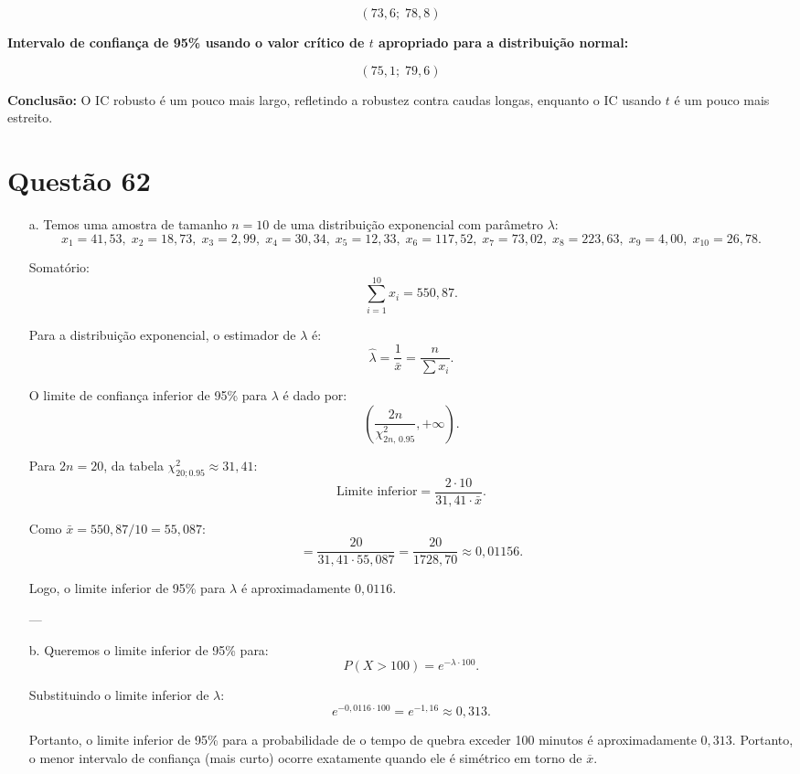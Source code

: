 \documentclass[12pt]{article}
\newcommand{\quest}[1]{\section*{Questão #1}} %
\begin{document}
\[
(73,6;\; 78,8)
\]

\textbf{Intervalo de confiança de 95\% usando o valor crítico de \(t\) apropriado para a distribuição normal:}

\[
(75,1;\; 79,6)
\]

\textbf{Conclusão:} O IC robusto é um pouco mais largo, refletindo a robustez contra caudas longas, enquanto o IC usando \(t\) é um pouco mais estreito.


\quest{62}

\begin{enumerate}
    \item[a.] Temos uma amostra de tamanho \(n=10\) de uma distribuição exponencial com parâmetro \(\lambda\):
    \[
    x_1=41,53,\; x_2=18,73,\; x_3=2,99,\; x_4=30,34,\; x_5=12,33,\; 
    x_6=117,52,\; x_7=73,02,\; x_8=223,63,\; x_9=4,00,\; x_{10}=26,78.
    \]
    
    Somatório:
    \[
    \sum_{i=1}^{10} x_i = 550,87.
    \]
    
    Para a distribuição exponencial, o estimador de \(\lambda\) é:
    \[
    \hat{\lambda} = \frac{1}{\bar{x}} = \frac{n}{\sum x_i}.
    \]
    
    O limite de confiança inferior de 95\% para \(\lambda\) é dado por:
    \[
    \left( \frac{2n}{\chi^2_{2n,\,0.95}} , +\infty \right).
    \]
    
    Para \(2n=20\), da tabela \(\chi^2_{20;0.95} \approx 31,41\):
    \[
    \text{Limite inferior} = \frac{2 \cdot 10}{31,41 \cdot \bar{x}}.
    \]
    
    Como \(\bar{x} = 550,87/10 = 55,087\):
    \[
    = \frac{20}{31,41 \cdot 55,087} 
    = \frac{20}{1728,70} 
    \approx 0,01156.
    \]
    
    Logo, o limite inferior de 95\% para \(\lambda\) é aproximadamente \(0,0116\).
    
    ---
    
    \item[b.] Queremos o limite inferior de 95\% para:
    \[
    P(X>100) = e^{-\lambda \cdot 100}.
    \]
    
    Substituindo o limite inferior de \(\lambda\):
    \[
    e^{-0,0116 \cdot 100} = e^{-1,16} \approx 0,313.
    \]
    
    Portanto, o limite inferior de 95\% para a probabilidade de o tempo de quebra exceder 100 minutos é aproximadamente \(0,313\).
    Portanto, o menor intervalo de confiança (mais curto) ocorre exatamente quando ele é simétrico em torno de \(\overline{x}\).
\end{enumerate}
\end{document}
